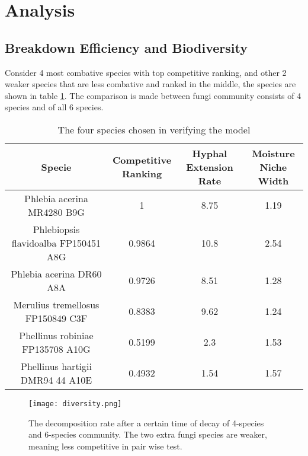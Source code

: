 \section{Analysis}\label{sec:analysis}

\subsection{Breakdown Efficiency and Biodiversity}

Consider 4 most combative species with top competitive ranking, and other 2 weaker species that are less combative and ranked in the middle, the species are shown in table \ref{tb:bio-div}. The comparison is made between fungi community consists of 4 species and of all 6 species.

\begin{table}\caption{The four species chosen in verifying the model}\label{tb:bio-div}
    \centering
    \begin{tabular}{c|ccc}
        \toprule
        Specie                               & \makecell[c]{Competitive               \\Ranking} & \makecell[c]{Hyphal\\Extension Rate} & \makecell[c]{Moisture\\Niche Width} \\
        \midrule
        Phlebia acerina MR4280 B9G           & 1                        & 8.75 & 1.19 \\
        Phlebiopsis flavidoalba FP150451 A8G & 0.9864                   & 10.8 & 2.54 \\
        Phlebia acerina DR60 A8A             & 0.9726                   & 8.51 & 1.28 \\
        Merulius tremellosus FP150849 C3F    & 0.8383                   & 9.62 & 1.24 \\
        Phellinus robiniae FP135708 A10G     & 0.5199                   & 2.3  & 1.53 \\
        Phellinus hartigii DMR94 44 A10E     & 0.4932                   & 1.54 & 1.57 \\
        \bottomrule
    \end{tabular}
\end{table}

\begin{figure}[ht]
    \caption{The decomposition rate after a certain time of decay of 4-species and 6-species community. The two extra fungi species are weaker, meaning less competitive in pair wise test.}
    \label{fig:diversity}
    \centering
    \texttt{[image: diversity.png]}
\end{figure}

